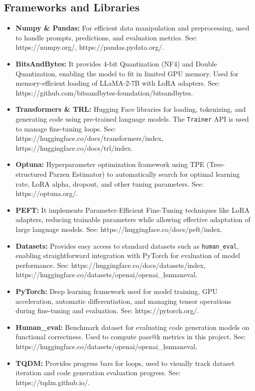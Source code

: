 \subsection{Frameworks and Libraries}
\begin{itemize}
    \item \textbf{Numpy \& Pandas:} For efficient data manipulation and preprocessing, used to handle prompts, predictions, and evaluation metrics. See: https://numpy.org/, https://pandas.pydata.org/.
    \item \textbf{BitsAndBytes:} It provides 4-bit Quantization (NF4) and Double Quantization, enabling the model to fit in limited GPU memory. Used for memory-efficient loading of LLaMA-2-7B with LoRA adapters. See: https://github.com/bitsandbytes-foundation/bitsandbytes.
    \item \textbf{Transformers \& TRL:} Hugging Face libraries for loading, tokenizing, and generating code using pre-trained language models. The \texttt{Trainer} API is used to manage fine-tuning loops. See: https://huggingface.co/docs/transformers/index, https://huggingface.co/docs/trl/index.
    \item \textbf{Optuna:} Hyperparameter optimization framework using TPE (Tree-structured Parzen Estimator) to automatically search for optimal learning rate, LoRA alpha, dropout, and other tuning parameters. See: https://optuna.org/.
    \item \textbf{PEFT:} It implements Parameter-Efficient Fine-Tuning techniques like LoRA adapters, reducing trainable parameters while allowing effective adaptation of large language models. See: https://huggingface.co/docs/peft/index.
    \item \textbf{Datasets:} Provides easy access to standard datasets such as \texttt{human\_eval}, enabling straightforward integration with PyTorch for evaluation of model performance. See: https://huggingface.co/docs/datasets/index, https://huggingface.co/datasets/openai/openai_humaneval.
    \item \textbf{PyTorch:} Deep learning framework used for model training, GPU acceleration, automatic differentiation, and managing tensor operations during fine-tuning and evaluation. See: https://pytorch.org/.
    \item \textbf{Human\_eval:} Benchmark dataset for evaluating code generation models on functional correctness. Used to compute pass@k metrics in this project. See: https://huggingface.co/datasets/openai/openai_humaneval.
    \item \textbf{TQDM:} Provides progress bars for loops, used to visually track dataset iteration and code generation evaluation progress. See: https://tqdm.github.io/.

\end{itemize}
